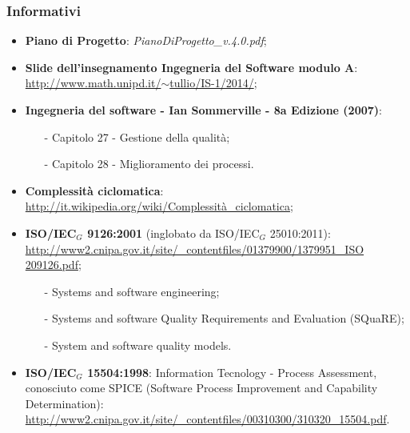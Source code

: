 \subsubsection{Informativi}
\begin{itemize}
	\item \textbf{Piano di Progetto}: \textit{PianoDiProgetto\_v.4.0.pdf};
	\item \textbf{Slide dell'insegnamento Ingegneria del Software modulo A}:\\ \href{http://www.math.unipd.it/~tullio/IS-1/2014/}{http://www.math.unipd.it/$\sim$tullio/IS-1/2014/};
	\item \textbf{Ingegneria del software - Ian Sommerville - 8a Edizione (2007)}:
	\begin{itemize}
		\item[-] Capitolo 27 - Gestione della qualità;
		\item[-] Capitolo 28 - Miglioramento dei processi.
	\end{itemize}
	\item \textbf{Complessità ciclomatica}: \href {http://it.wikipedia.org/wiki/Complessità\_ciclomatica}{http://it.wikipedia.org/wiki/Complessità\_ciclomatica};
	\item \textbf{ISO/IEC$_G$ 9126:2001} (inglobato da ISO/IEC$_G$ 25010:2011):\\
	\href{http://www2.cnipa.gov.it/site/_contentfiles/01379900/1379951_ISO \%209126.pdf}{http://www2.cnipa.gov.it/site/\_contentfiles/01379900/1379951\_ISO  209126.pdf};	\begin{itemize}
		\item[-] Systems and software engineering;
		\item[-] Systems and software Quality Requirements and Evaluation (SQuaRE);
		\item[-] System and software quality models.
	\end{itemize}
	\item \textbf{ISO/IEC$_G$ 15504:1998}: Information Tecnology - Process Assessment, conosciuto come SPICE (Software Process Improvement and Capability Determination): \href{http://www2.cnipa.gov.it/site/_contentfiles/00310300/310320_15504.pdf}{http://www2.cnipa.gov.it/site/\_contentfiles/00310300/310320\_15504.pdf}.
\end{itemize}